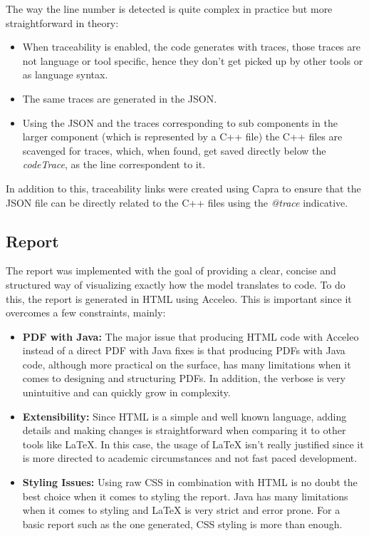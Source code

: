 The way the line number is detected is quite complex in practice but more straightforward in theory:

\begin{itemize} 
	\item When traceability is enabled, the code generates with traces, those traces are not language or tool specific, hence they don't get picked up by other tools or as language syntax.
	\item The same traces are generated in the \gls{JSON}.
	\item Using the \gls{JSON} and the traces corresponding to sub components in the larger component (which is represented by a C++ file) the C++ files are scavenged for traces, which, when found, get saved directly below the \textit{codeTrace}, as the line correspondent to it.
\end{itemize}

In addition to this, traceability links were created using Capra to ensure that the \gls{JSON} file can be directly related to the C++ files using the \textit{@trace} indicative.

\subsection{Report}
\label{sec:impl_report}

The report was implemented with the goal of providing a clear, concise and structured way of visualizing exactly how the model translates to code. To do this, the report is generated in \gls{HTML} using Acceleo. This is important since it overcomes a few constraints, mainly:

\begin{itemize} 
	\item \textbf{PDF with Java:} The major issue that producing \gls{HTML} code with Acceleo instead of a direct PDF with Java fixes is that producing PDFs with Java code, although more practical on the surface, has many limitations when it comes to designing and structuring PDFs. In addition, the verbose is very unintuitive and can quickly grow in complexity.
	\item \textbf{Extensibility:} Since \gls{HTML} is a simple and well known language, adding details and making changes is straightforward when comparing it to other tools like LaTeX. In this case, the usage of LaTeX isn't really justified since it is more directed to academic circumstances and not fast paced development. 
	\item \textbf{Styling Issues:} Using raw \gls{CSS} in combination with \gls{HTML} is no doubt the best choice when it comes to styling the report. Java has many limitations when it comes to styling and LaTeX is very strict and error prone. For a basic report such as the one generated, \gls{CSS} styling is more than enough.
\end{itemize}

